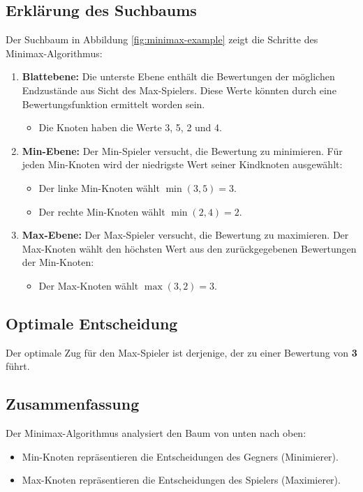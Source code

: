 \subsection*{Erklärung des Suchbaums}

Der Suchbaum in Abbildung \ref{fig:minimax-example} zeigt die Schritte des Minimax-Algorithmus:

\begin{enumerate}
	\item \textbf{Blattebene:} Die unterste Ebene enthält die Bewertungen der möglichen Endzustände aus Sicht des Max-Spielers. Diese Werte könnten durch eine Bewertungsfunktion ermittelt worden sein.
	\begin{itemize}
		\item Die Knoten haben die Werte 3, 5, 2 und 4.
	\end{itemize}
	
	\item \textbf{Min-Ebene:} Der Min-Spieler versucht, die Bewertung zu minimieren. Für jeden Min-Knoten wird der niedrigste Wert seiner Kindknoten ausgewählt:
	\begin{itemize}
		\item Der linke Min-Knoten wählt $\min(3, 5) = 3$.
		\item Der rechte Min-Knoten wählt $\min(2, 4) = 2$.
	\end{itemize}
	
	\item \textbf{Max-Ebene:} Der Max-Spieler versucht, die Bewertung zu maximieren. Der Max-Knoten wählt den höchsten Wert aus den zurückgegebenen Bewertungen der Min-Knoten:
	\begin{itemize}
		\item Der Max-Knoten wählt $\max(3, 2) = 3$.
	\end{itemize}
\end{enumerate}

\subsection*{Optimale Entscheidung}

Der optimale Zug für den Max-Spieler ist derjenige, der zu einer Bewertung von \textbf{3} führt.

\subsection*{Zusammenfassung}

Der Minimax-Algorithmus analysiert den Baum von unten nach oben:
\begin{itemize}
	\item Min-Knoten repräsentieren die Entscheidungen des Gegners (Minimierer).
	\item Max-Knoten repräsentieren die Entscheidungen des Spielers (Maximierer).
\end{itemize}

